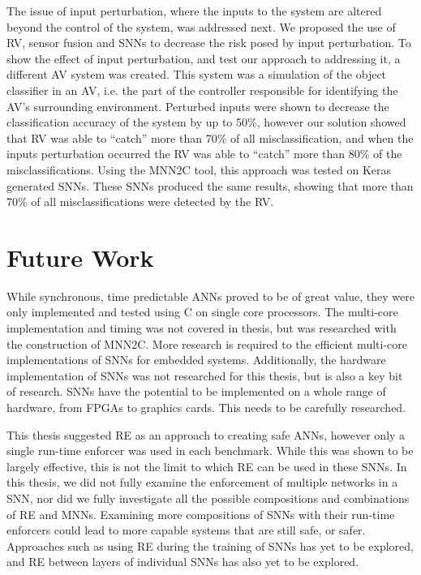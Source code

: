 The issue of input perturbation, where the inputs to the system are altered beyond the control of the system, was addressed next.
We proposed the use of \acf{RV}, sensor fusion and \acp{SNN} to decrease the risk posed by input perturbation.
To show the effect of input perturbation, and test our approach to addressing it, a different \ac{AV} system was created. 
This system was a simulation of the object classifier in an \ac{AV}, i.e. the part of the controller responsible for identifying the \ac{AV}'s surrounding environment.
Perturbed inputs were shown to decrease the classification accuracy of the system by up to 50\%, however our solution showed that \ac{RV} was able to ``catch'' more than 70\% of all misclassification, and when the inputs perturbation occurred the \ac{RV} was able to ``catch'' more than 80\% of the misclassifications.
Using the \ac{MNN2C} tool, this approach was tested on Keras generated \acp{SNN}.
These \acp{SNN} produced the same results, showing that more than 70\% of all misclassifications were detected by the \ac{RV}.

\section{Future Work}

While synchronous, time predictable \acp{ANN} proved to be of great value, they were only implemented and tested using C on single core processors.
The multi-core implementation and timing was not covered in thesis, but was researched with the construction of \ac{MNN2C}.
More research is required to the efficient multi-core implementations of \acp{SNN} for embedded systems.
Additionally, the hardware implementation of \acp{SNN} was not researched for this thesis, but is also a key bit of research.
\acp{SNN} have the potential to be implemented on a whole range of hardware, from \acfp{FPGA} to graphics cards.
This needs to be carefully researched. 

This thesis suggested \ac{RE} as an approach to creating safe \acp{ANN}, however only a single run-time enforcer was used in each benchmark.
While this was shown to be largely effective, this is not the limit to which \ac{RE} can be used in these \acp{SNN}.
In this thesis, we did not fully examine the enforcement of multiple networks in a \ac{SNN}, nor did we fully investigate all the possible compositions and combinations of \ac{RE} and \acp{MNN}.
Examining more compositions of \acp{SNN} with their run-time enforcers could lead to more capable systems that are still safe, or safer. 
Approaches such as using \ac{RE} during the training of \acp{SNN} has yet to be explored, and \ac{RE} between layers of individual \acp{SNN} has also yet to be explored.

